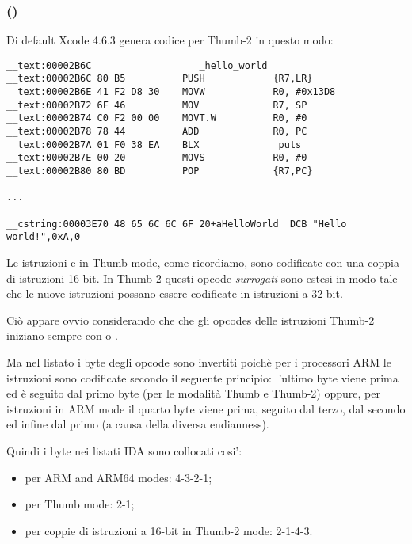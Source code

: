 \subsubsection{\OptimizingXcodeIV (\ThumbTwoMode)}

Di default Xcode 4.6.3 genera codice per Thumb-2 in questo modo:

\begin{lstlisting}[caption=\OptimizingXcodeIV (\ThumbTwoMode),style=customasmARM]
__text:00002B6C                   _hello_world
__text:00002B6C 80 B5          PUSH            {R7,LR}
__text:00002B6E 41 F2 D8 30    MOVW            R0, #0x13D8
__text:00002B72 6F 46          MOV             R7, SP
__text:00002B74 C0 F2 00 00    MOVT.W          R0, #0
__text:00002B78 78 44          ADD             R0, PC
__text:00002B7A 01 F0 38 EA    BLX             _puts
__text:00002B7E 00 20          MOVS            R0, #0
__text:00002B80 80 BD          POP             {R7,PC}

...

__cstring:00003E70 48 65 6C 6C 6F 20+aHelloWorld  DCB "Hello world!",0xA,0
\end{lstlisting}


\myindex{\ThumbTwoMode}

Le istruzioni  e  in Thumb mode, come ricordiamo, sono codificate con una coppia di istruzioni 16-bit.
In Thumb-2 questi opcode \emph{surrogati} sono estesi in modo tale che le nuove istruzioni possano essere codificate in istruzioni a 32-bit.

Ciò appare ovvio considerando che che gli opcodes delle istruzioni Thumb-2 iniziano sempre con  o .

Ma nel listato \IDA
i byte degli opcode sono invertiti poichè per i processori ARM le istruzioni sono codificate secondo il seguente principio:
l'ultimo byte viene prima ed è seguito dal primo byte (per le modalità Thumb e Thumb-2)
oppure, per istruzioni in ARM mode il quarto byte viene prima, seguito dal terzo, dal secondo ed infine dal primo (a causa
della diversa \gls{endianness}).

Quindi i byte nei listati IDA sono collocati cosi':
\begin{itemize}
\item per ARM and ARM64 modes: 4-3-2-1;
\item per Thumb mode: 2-1;
\item per coppie di istruzioni a 16-bit in Thumb-2 mode: 2-1-4-3.
\end{itemize}

